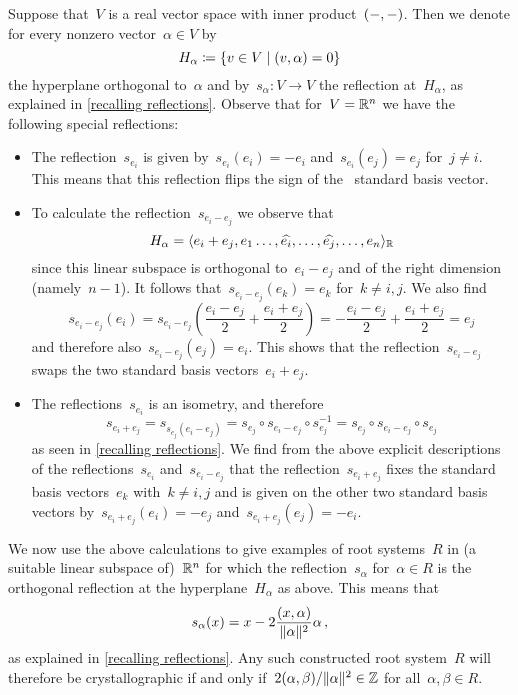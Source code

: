 \begin{examples}
  \label{root systems in Rn}
  Suppose that~$V$ is a real vector space with inner product~$(-,-)$.
  Then we denote for every nonzero vector~$\alpha \in V$ by
  \[
    H_\alpha
    \defined
    \{
      v \in V
    \suchthat
      \inner{v,\alpha}
      =
      0
    \}
  \]
  the hyperplane orthogonal to~$\alpha$ and by~$s_\alpha \colon V \to V$ the reflection at~$H_\alpha$, as explained in \cref{recalling reflections}.
  Observe that for~$V = \mathbb{R}^n$ we have the following special reflections:
  \begin{itemize}
    \item
      The reflection~$s_{e_i}$ is given by~$s_{e_i}(e_i) = -e_i$ and~$s_{e_i}(e_j) = e_j$ for~$j \neq i$.
      This means that this reflection flips the sign of the~{} standard basis vector.
    \item
      To calculate the reflection~$s_{e_i - e_j}$ we observe that
      \[
        H_\alpha
        =
        \langle
          e_i + e_j,
          e_1
          \dotsc,
          \widehat{e_i},
          \dotsc,
          \widehat{e_j},
          \dotsc,
          e_n
        \rangle_{\mathbb{R}}
      \]
      since this linear subspace is orthogonal to~$e_i - e_j$ and of the right dimension (namely~$n-1$).
      It follows that~$s_{e_i-e_j}(e_k) = e_k$ for~$k \neq i,j$.
      We also find
      \[
        s_{e_i-e_j}(e_i)
        =
        s_{e_i-e_j}\left( \frac{e_i - e_j}{2} + \frac{e_i + e_j}{2} \right)
        =
        -\frac{e_i - e_j}{2} + \frac{e_i + e_j}{2}
        =
        e_j
      \]
      and therefore also~$s_{e_i-e_j}(e_j) = e_i$.
      This shows that the reflection~$s_{e_i-e_j}$ swaps the two standard basis vectors~$e_i+e_j$.
    \item
      The reflections~$s_{e_i}$ is an isometry, and therefore
      \[
        s_{e_i + e_j}
        =
        s_{s_{e_j}(e_i - e_j)}
        =
        s_{e_j} \circ s_{e_i - e_j} \circ s_{e_j}^{-1}
        =
        s_{e_j} \circ s_{e_i - e_j} \circ s_{e_j}
      \]
      as seen in \cref{recalling reflections}.
      We find from the above explicit descriptions of the reflections~$s_{e_i}$ and~$s_{e_i - e_j}$ that the reflection~$s_{e_i + e_j}$ fixes the standard basis vectors~$e_k$ with~$k \neq i,j$ and is given on the other two standard basis vectors by~$s_{e_i + e_j}(e_i) = -e_j$ and~$s_{e_i + e_j}(e_j) = -e_i$.
  \end{itemize}
  
  We now use the above calculations to give examples of root systems~$R$ in (a suitable linear subspace of)~$\mathbb{R}^n$ for which the reflection~$s_\alpha$ for~$\alpha \in R$ is the orthogonal reflection at the hyperplane~$H_\alpha$ as above.
  This means that
  \[
    s_\alpha(x)
    =
    x - 2 \frac{(x,\alpha)}{\lVert\alpha\rVert^2} \alpha \,,
  \]
  as explained in \cref{recalling reflections}.
  Any such constructed root system~$R$ will therefore be crystallographic if and only if~$2 (\alpha,\beta)/\lVert\alpha\rVert^2 \in \mathbb{Z}$ for all~$\alpha, \beta \in R$.


\end{examples}
